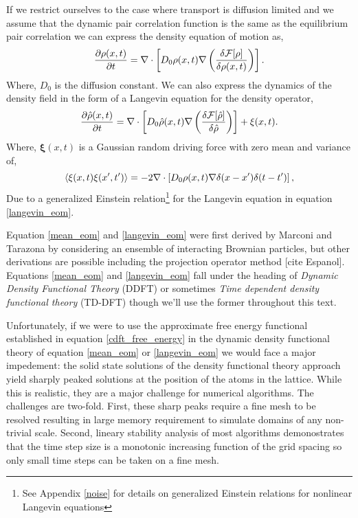 {
    \color{ForestGreen}

If we restrict ourselves to the case where
transport is diffusion limited and we assume that the dynamic pair correlation
function is the same as the equilibrium pair correlation we can express the
density equation of motion as,
%
\begin{equation}
    \label{mean_eom}
    \frac{\partial \rho(x, t)}{\partial t} = 
        \nabla \cdot \left[
            D_0 \rho(x, t) \nabla \left(\frac{\delta \mathcal{F}[\rho]}{\delta \rho(x, t)}\right)
        \right].
\end{equation}
%
Where, $D_0$ is the diffusion constant. We can also express the dynamics of
the density field in the form of a Langevin equation for the density operator,
%
\begin{equation}
    \label{langevin_eom}
    \frac{\partial \hat{\rho}(x, t)}{\partial t} =
        \nabla \cdot \left[
            D_0 \hat{\rho}(x, t) \nabla \left(\frac{\delta \mathcal{F}[\hat{\rho}]}{\delta \hat{\rho}}\right)
        \right] + \xi(x, t).
\end{equation}
%
Where, $\mathbf{\xi}(x, t)$ is a Gaussian random driving force with zero mean
and variance of,
%
\begin{equation}
    \left\langle \xi(x, t)\xi(x^\prime, t^\prime) \right\rangle = -2 \nabla \cdot \left[ D_0 \rho(x,t) 
        \nabla \delta(x - x^\prime) \delta(t - t^\prime)
    \right],
\end{equation}
%
Due to a generalized Einstein relation\footnote{See Appendix \ref{noise} for
details on generalized Einstein relations for nonlinear Langevin equations} for
the Langevin equation in equation \ref{langevin_eom}.

Equation \ref{mean_eom} and \ref{langevin_eom} were first derived by Marconi
and Tarazona by considering an ensemble of interacting Brownian particles, but
other derivations are possible including the projection operator method [cite
Espanol].  Equations \ref{mean_eom} and \ref{langevin_eom} fall under the
heading of \textit{Dynamic Density Functional Theory} (DDFT) or sometimes
\textit{Time dependent density functional theory} (TD-DFT) though we'll use the
former throughout this text.
}

Unfortunately, if we were to use the approximate free energy functional
established in equation \ref{cdft_free_energy} in the dynamic density
functional theory of equation \ref{mean_eom} or \ref{langevin_eom} we would
face a major impedement: the solid state solutions of the density functional
theory approach yield sharply peaked solutions at the position of the atoms in
the lattice. While this is realistic, they are a major challenge for numerical
algorithms. The challenges are two-fold. First, these sharp peaks require a
fine mesh to be resolved resulting in large memory requirement to simulate
domains of any non-trivial scale. Second, lineary stability analysis of most
algorithms demonostrates that the time step size is a monotonic increasing
function of the grid spacing so only small time steps can be taken on a fine
mesh.


